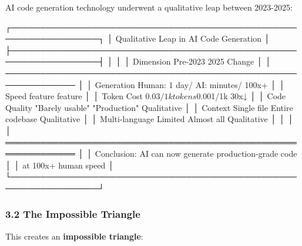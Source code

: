 \documentclass[
]{article}
\newenvironment{Shaded}{}{}
\newcommand{\NormalTok}[1]{#1}
\begin{document}
AI code generation technology underwent a qualitative leap between
2023-2025:

\begin{Shaded}
\begin{Highlighting}[]
\NormalTok{┌─────────────────────────────────────────────────────────────────┐}
\NormalTok{│          Qualitative Leap in AI Code Generation                  │}
\NormalTok{├─────────────────────────────────────────────────────────────────┤}
\NormalTok{│                                                                  │}
\NormalTok{│  Dimension       Pre{-}2023           2025            Change      │}
\NormalTok{│  ────────────────────────────────────────────────────────────── │}
\NormalTok{│  Generation      Human: 1 day/     AI: minutes/    100x+        │}
\NormalTok{│  Speed           feature           feature                      │}
\NormalTok{│  Token Cost      $0.03/1k tokens   $0.001/1k       30x↓         │}
\NormalTok{│  Code Quality    "Barely usable"   "Production"    Qualitative  │}
\NormalTok{│  Context         Single file       Entire codebase Qualitative  │}
\NormalTok{│  Multi{-}language  Limited           Almost all      Qualitative  │}
\NormalTok{│                                                                  │}
\NormalTok{│  ══════════════════════════════════════════════════════════════  │}
\NormalTok{│  Conclusion: AI can now generate production{-}grade code          │}
\NormalTok{│             at 100x+ human speed                                │}
\NormalTok{└─────────────────────────────────────────────────────────────────┘}
\end{Highlighting}
\end{Shaded}

\hypertarget{32-the-impossible-triangle}{%
\subsubsection{3.2 The Impossible
Triangle}\label{32-the-impossible-triangle}}

This creates an \textbf{impossible triangle}:
\end{document}

